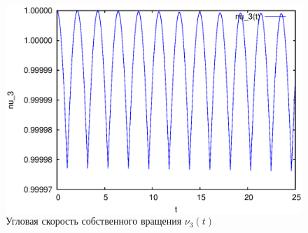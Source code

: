 \begin{figure}[H]
\begin{columns}
            \includegraphics[width=\linewidth]{pic/rol__self_rot__velocity_of_self_rotation}
            \caption{Угловая скорость собственного вращения $\nu_3(t)$}
    \end{columns}
    
\end{figure}
